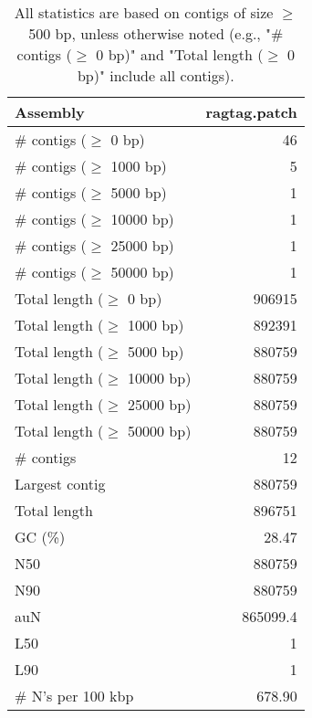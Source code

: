 \documentclass[12pt,a4paper]{article}
\begin{document}
\begin{table}[ht]
\begin{center}
\caption{All statistics are based on contigs of size $\geq$ 500 bp, unless otherwise noted (e.g., "\# contigs ($\geq$ 0 bp)" and "Total length ($\geq$ 0 bp)" include all contigs).}
\begin{tabular}{|l*{1}{|r}|}
\hline
Assembly & ragtag.patch \\ \hline
\# contigs ($\geq$ 0 bp) & 46 \\ \hline
\# contigs ($\geq$ 1000 bp) & 5 \\ \hline
\# contigs ($\geq$ 5000 bp) & 1 \\ \hline
\# contigs ($\geq$ 10000 bp) & 1 \\ \hline
\# contigs ($\geq$ 25000 bp) & 1 \\ \hline
\# contigs ($\geq$ 50000 bp) & 1 \\ \hline
Total length ($\geq$ 0 bp) & 906915 \\ \hline
Total length ($\geq$ 1000 bp) & 892391 \\ \hline
Total length ($\geq$ 5000 bp) & 880759 \\ \hline
Total length ($\geq$ 10000 bp) & 880759 \\ \hline
Total length ($\geq$ 25000 bp) & 880759 \\ \hline
Total length ($\geq$ 50000 bp) & 880759 \\ \hline
\# contigs & 12 \\ \hline
Largest contig & 880759 \\ \hline
Total length & 896751 \\ \hline
GC (\%) & 28.47 \\ \hline
N50 & 880759 \\ \hline
N90 & 880759 \\ \hline
auN & 865099.4 \\ \hline
L50 & 1 \\ \hline
L90 & 1 \\ \hline
\# N's per 100 kbp & 678.90 \\ \hline
\end{tabular}
\end{center}
\end{table}
\end{document}
